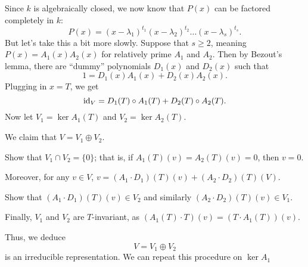 Since $k$ is algebraically closed, we now know that $P(x)$ can be factored completely in $k$:
\[ P(x) = \left( x - \lambda_1 \right)^{t_1} \left( x - \lambda_2 \right)^{t_2} \dots (x - \lambda_s)^{t_s}. \]
But let's take this a bit more slowly.
Suppose that $s \ge 2$, meaning $P(x) = A_1(x) A_2(x)$ for relatively prime $A_1$ and $A_2$.
Then by Bezout's lemma, there are ``dummy'' polynomials $D_1(x)$ and $D_2(x)$ such that
\[ 1 = D_1(x) A_1(x) + D_2(x) A_2(x). \]
Plugging in $x=T$, we get
\[ \mathrm{id}_V = D_1(T) \circ A_1(T) + D_2(T) \circ A_2(T). \]
Now let $V_1 = \ker A_1(T)$ and $V_2 = \ker A_2(T)$.

We claim that $V = V_1 \oplus V_2$.
\begin{ques}
	Show that $V_1 \cap V_2 = \{0\}$; that is,
	if $A_1(T)(v) = A_2(T)(v) = 0$, then $v=0$.
\end{ques}
Moreover, for any $v \in V$, $v = (A_1 \cdot D_1)(T)(v) + (A_2 \cdot D_2)(T)(V)$.
\begin{ques}
	Show that $(A_1 \cdot D_1)(T)(v) \in V_2$
	and similarly $(A_2 \cdot D_2)(T)(v) \in V_1$.
\end{ques}
Finally, $V_1$ and $V_2$ are $T$-invariant, as $(A_1(T) \cdot T)(v) = (T \cdot A_1(T))(v)$.

Thus, we deduce
\[ V = V_1 \oplus V_2 \]
is an irreducible representation.
We can repeat this procedure on $\ker A_1$
